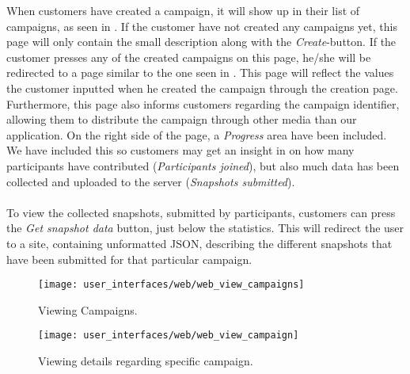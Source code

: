 When customers have created a campaign, it will show up in their list of campaigns, as seen in . If the customer have not created any campaigns yet, this page will only contain the small description along with the \emph{Create}-button. If the customer presses any of the created campaigns on this page, he/she will be redirected to a page similar to the one seen in . This page will reflect the values the customer inputted when he created the campaign through the creation page. Furthermore, this page also informs customers regarding the campaign identifier, allowing them to distribute the campaign through other media than our application. On the right side of the page, a \emph{Progress} area have been included. We have included this so customers may get an insight in on how many participants have contributed (\emph{Participants joined}), but also much data has been collected and uploaded to the server (\emph{Snapshots submitted}). 
\\\\
To view the collected snapshots, submitted by participants, customers can press the \emph{Get snapshot data} button, just below the statistics. This will redirect the user to a site, containing unformatted JSON, describing the different snapshots that have been submitted for that particular campaign.




\begin{figure}[!htbp]
\centering
\texttt{[image: user\_interfaces/web/web\_view\_campaigns]}
\caption{Viewing Campaigns.}
\label{fig:web_view_campaigns}
\end{figure}
\FloatBarrier

\begin{figure}[!htbp]
\centering
\texttt{[image: user\_interfaces/web/web\_view\_campaign]}
\caption{Viewing details regarding specific campaign.}
\label{fig:web_view_campaign}
\end{figure}
\FloatBarrier

